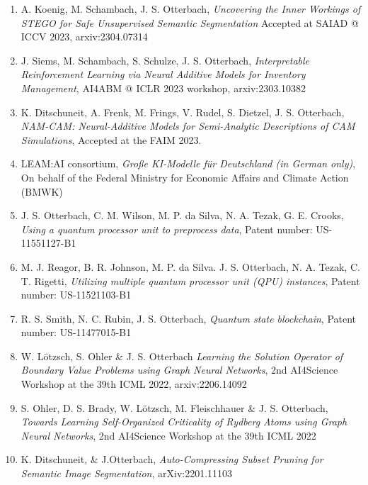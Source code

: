 \documentclass[10pt,centered]{./res} %
\begin{document}
\begin{resume}
\begin{enumerate}
  \item A. Koenig, M. Schambach, J. S. Otterbach, \textit{Uncovering the Inner Workings of STEGO for Safe Unsupervised Semantic Segmentation}
Accepted at SAIAD @ ICCV 2023, arxiv:2304.07314

  \item J. Siems, M. Schambach, S. Schulze, J. S. Otterbach, \textit{Interpretable Reinforcement Learning via Neural Additive Models for Inventory Management}, AI4ABM @ ICLR 2023 workshop, arxiv:2303.10382

  \item K. Ditschuneit, A. Frenk, M. Frings, V. Rudel, S. Dietzel, J. S. Otterbach, \textit{NAM-CAM: Neural-Additive Models for Semi-Analytic Descriptions of CAM Simulations}, Accepted at the FAIM 2023.

  \item LEAM:AI consortium, \textit{Große KI-Modelle für Deutschland (in German only)}, On behalf of the Federal Ministry for Economic Affairs and Climate Action (BMWK)

  \item J. S. Otterbach, C. M. Wilson, M. P. da Silva, N. A. Tezak, G. E. Crooks, \textit{Using a quantum processor unit to preprocess data}, Patent number: US-11551127-B1

  \item M. J. Reagor, B. R. Johnson, M. P. da Silva. J. S. Otterbach, N. A. Tezak, C. T. Rigetti, \textit{Utilizing multiple quantum processor unit (QPU) instances}, Patent number: US-11521103-B1

  \item R. S. Smith, N. C. Rubin, J. S. Otterbach, \textit{Quantum state blockchain}, Patent number: US-11477015-B1

  \item W. Lötzsch, S. Ohler \& J. S. Otterbach \textit{Learning the Solution Operator of Boundary Value Problems using Graph Neural Networks}, 2nd AI4Science Workshop at the 39th ICML 2022, arxiv:2206.14092

  \item S. Ohler, D. S. Brady, W. Lötzsch, M. Fleischhauer \& J. S. Otterbach, \textit{Towards Learning Self-Organized Criticality of Rydberg Atoms using Graph Neural Networks}, 2nd AI4Science Workshop at the 39th ICML 2022

  \item K. Ditschuneit, \& J.Otterbach, \textit{Auto-Compressing Subset Pruning for Semantic Image Segmentation}, arXiv:2201.11103


\end{enumerate}
\end{resume}
\end{document}
